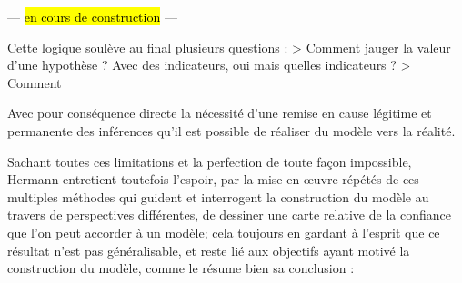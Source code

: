 --- \hl{en cours de construction} ---

Cette logique soulève au final plusieurs questions :
> Comment jauger la valeur d'une hypothèse ? Avec des indicateurs, oui mais quelles indicateurs ?
> Comment






Avec pour conséquence directe la nécessité d'une remise en cause légitime et permanente des inférences qu'il est possible de réaliser du modèle vers la réalité.



Sachant toutes ces limitations et la perfection de toute façon impossible, Hermann entretient toutefois l'espoir, par la mise en œuvre répétés de ces multiples méthodes qui guident et interrogent la construction du modèle au travers de perspectives différentes, de dessiner une carte relative de la confiance que l'on peut accorder à un modèle; cela toujours en gardant à l'esprit que ce résultat n'est pas généralisable, et reste lié aux objectifs ayant motivé la construction du modèle, comme le résume bien sa conclusion :

